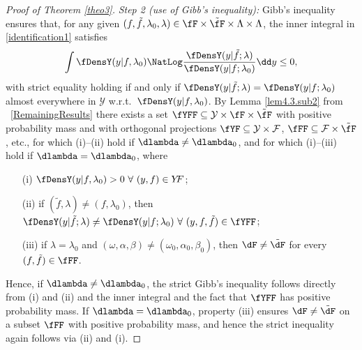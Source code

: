 \begin{proof}[Proof of Theorem \ref{theo3}]
\smallskip
\textit{Step 2 (use of Gibb's inequality):}
Gibb's inequality ensures that, for any given $(f,\tilde{f},\lambda_{0},\lambda) \in \fF \times \tilde{\fF} \times \Lambda \times \Lambda$, the inner integral in \eqref{identification1} satisfies 
    \begin{equation*}
    \int \fDensY(y|f,\lambda_{0}) \NatLog\frac{ \fDensY(y|  \tilde{f};\lambda) }{\fDensY(y|f;\lambda_{0} )}  \dd y  \leq 0    ,
\end{equation*}
with strict equality holding if and only if 
$\fDensY(y|  \tilde{f};\lambda) = \fDensY(y|f;\lambda_{0} )$ 
almost everywhere in 
$\mathcal{Y}$ w.r.t.~$\fDensY(y|f,\lambda_{0})$. 
By Lemma \ref{lem4.3.sub2} from \SupplementaryAppendix\ \ref{RemainingResults} there exists a set
$\fYFF \subseteq \mathcal{Y} \times \fF \times \tilde{\fF}$
with positive probability mass and with orthogonal projections 
$\fYF \subseteq \mathcal{Y} \times \mathcal{F}$,
$\fFF \subseteq \mathcal{F} \times \tilde{\fF}$, 
etc.,
for which (i)--(ii) hold if $\dlambda\not=\dlambda_0$,
and for which (i)--(iii) hold if $\dlambda=\dlambda_0$, 
where
\begin{enumerate}
	\item[(i)] $\fDensY(y|f,\lambda_{0}) >0 \ \forall \ (y,f) \in Y \hspace{-0.1cm} F$; 
	\item[(ii)] if $(\tilde{f},\lambda) \neq (f,\lambda_0)$, then $\fDensY(y|  \tilde{f};\lambda) \neq \fDensY(y|f;\lambda_{0} ) \ \forall \ (y,f,\tilde{f}) \in \fYFF$;
	\item[(iii)] if $\lambda = \lambda_{0}$ and $(\omega,\alpha,\beta) \neq (\omega_{0},\alpha_{0},\beta_{0})$, then $\dF\not=\tilde\dF$ for every $(f,\tilde{f}) \in \fFF$.
\end{enumerate}
Hence, if $\dlambda\not=\dlambda_0$, the strict Gibb's inequality follows directly from (i) and (ii) and the inner integral and the fact that $\fYFF$ has positive probability mass.
If $\dlambda=\dlambda_0$, property (iii) ensures $\dF\not=\tilde\dF$ on a subset $\fFF$ with positive probability mass, and hence the strict inequality again follows via (ii) and (i).
\end{proof} 
 






